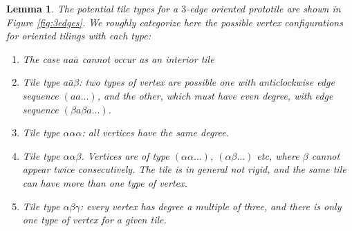 \documentclass[11pt]{amsart}
\newtheorem{lemma}[theorem]{Lemma}
\theoremstyle{remark}
\newcounter{case}
\begin{document}
\begin{lemma} \label{vertextypes}
The potential tile types for a $3$-edge oriented prototile are shown in Figure \ref{fig:3edges}.   We roughly
categorize here the possible vertex configurations for oriented tilings with each type:
\begin{enumerate}
\item The case $aa\bar a$ cannot occur as an interior tile
\item Tile type $a \bar a \beta$: two types of vertex are possible one with anticlockwise edge sequence $(a a  \dots)$,  and the other, which must have even degree, with edge sequence $(\beta a \beta a \dots)$. 
\item Tile type $\alpha \alpha \alpha$: all vertices have the same degree.
\item Tile type $\alpha \alpha \beta$.  Vertices are of type
$(\alpha \alpha \dots)$, $(\alpha \beta \dots)$ etc,  where $\beta$ cannot appear twice consecutively.
The tile is in general not rigid, and the same tile can have more than one type of vertex.
\item Tile type $\alpha \beta \gamma$: every vertex has degree a multiple of three, and 
there is only one type of vertex for a given tile.
\end{enumerate}
\end{lemma}
\end{document}
